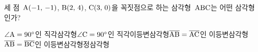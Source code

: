 세 점~$\mathrm{A}(-1,\,-1)$, $\mathrm{B}(2,\,4)$, $\mathrm{C}(3,\,0)$을 꼭짓점으로 하는 삼각형~$\mathrm{ABC}$는 어떤 삼각형인가?
\begin{choicesv}{$\angle\mathrm{A}=90^\circ$인 직각삼각형}{$\angle\mathrm{C}=90^\circ$인 직각이등변삼각형}{$\overline{\mathrm{AB}}=\overline{\mathrm{AC}}$인 이등변삼각형}{$\overline{\mathrm{AB}}=\overline{\mathrm{BC}}$인 이등변삼각형}{정삼각형}\end{choicesv}
